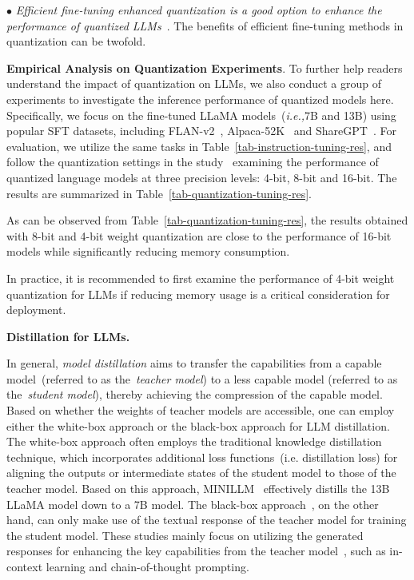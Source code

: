 {{
$\bullet$ \emph{Efficient fine-tuning enhanced quantization is a good option to enhance the performance of quantized LLMs}~\cite{Dettmers-CoRR-2023-QLoRA,Hu-ICLR-2022-LoRA}. The benefits of efficient fine-tuning methods in quantization can be twofold. 

\textbf{Empirical Analysis on Quantization Experiments}. To further help readers  understand the  impact of quantization on LLMs, we also conduct  a group of experiments to investigate the inference performance of quantized models here. Specifically, we focus on the fine-tuned LLaMA models~(\emph{i.e.,}7B and 13B) using popular SFT datasets, including FLAN-v2~\cite{Chung-arxiv-2022-Scaling}, Alpaca-52K~\cite{alpaca} and ShareGPT~\cite{ShareGPT}. For evaluation, we utilize the same tasks  in Table~\ref{tab-instruction-tuning-res}, and  follow the quantization settings in the study~\cite{Liu-2023-arxiv-Do_emergent} examining the performance of quantized language models at three precision levels: 4-bit, 8-bit and 16-bit. The results are summarized in Table~\ref{tab-quantization-tuning-res}.

As can be observed from Table~\ref{tab-quantization-tuning-res}, the results obtained with 8-bit and 4-bit weight quantization are close to the performance of 16-bit models while significantly reducing memory consumption. 

In practice, it is recommended to first examine the performance of 4-bit weight quantization for LLMs if reducing memory usage is a critical consideration for deployment.

\textbf{Distillation for LLMs.} 

{In general, \emph{model distillation} aims to transfer the capabilities from a capable model~(referred to as the~\emph{teacher model}) to a less capable model (referred to as the~\emph{student model}), thereby achieving the compression of the capable model. Based on whether the weights of {teacher models} are accessible, one can employ either the white-box approach or the black-box approach for LLM distillation. The white-box approach often employs the traditional knowledge distillation technique,  which incorporates additional loss functions~(i.e. distillation loss) for aligning the outputs or intermediate states of the student model to those of the teacher model. Based on this approach, MINILLM~\cite{Gu-CORR-2023-knowledge} effectively distills the 13B LLaMA model down to a 7B model. The black-box approach~\cite{Hsieh-ACL-2023-distilling}, on the other hand, can only make use of the textual response of the teacher model for training the student model. These studies mainly focus on utilizing the generated responses for enhancing the key capabilities from the teacher {model~\cite{Taori-github-2023-Stanford, Luo-arxiv-2023-WizardMath}}, such as in-context learning and chain-of-thought prompting.}

}}
